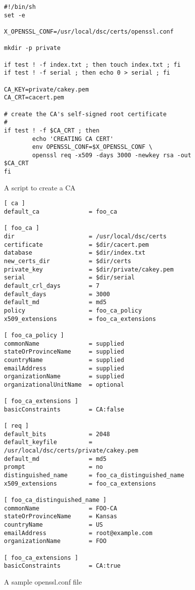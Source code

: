 \documentclass{report}
\begin{document}
\begin{figure}
\begin{verbatim}
#!/bin/sh
set -e

X_OPENSSL_CONF=/usr/local/dsc/certs/openssl.conf

mkdir -p private

if test ! -f index.txt ; then touch index.txt ; fi
if test ! -f serial ; then echo 0 > serial ; fi

CA_KEY=private/cakey.pem
CA_CRT=cacert.pem

# create the CA's self-signed root certificate
#
if test ! -f $CA_CRT ; then
        echo 'CREATING CA CERT'
        env OPENSSL_CONF=$X_OPENSSL_CONF \
        openssl req -x509 -days 3000 -newkey rsa -out $CA_CRT
fi
\end{verbatim}
\caption{\label{fig-create-ca-cert-sh}A script to create a CA}
\end{figure}


\begin{figure}
\begin{verbatim}
[ ca ]
default_ca              = foo_ca

[ foo_ca ]
dir                     = /usr/local/dsc/certs
certificate             = $dir/cacert.pem
database                = $dir/index.txt
new_certs_dir           = $dir/certs
private_key             = $dir/private/cakey.pem
serial                  = $dir/serial
default_crl_days        = 7
default_days            = 3000
default_md              = md5
policy                  = foo_ca_policy
x509_extensions         = foo_ca_extensions

[ foo_ca_policy ]
commonName              = supplied
stateOrProvinceName     = supplied
countryName             = supplied
emailAddress            = supplied
organizationName        = supplied
organizationalUnitName  = optional

[ foo_ca_extensions ]
basicConstraints        = CA:false

[ req ]
default_bits            = 2048
default_keyfile         = /usr/local/dsc/certs/private/cakey.pem
default_md              = md5
prompt                  = no
distinguished_name      = foo_ca_distinguished_name
x509_extensions         = foo_ca_extensions

[ foo_ca_distinguished_name ]
commonName              = FOO-CA
stateOrProvinceName     = Kansas
countryName             = US
emailAddress            = root@example.com
organizationName        = FOO

[ foo_ca_extensions ]
basicConstraints        = CA:true
\end{verbatim}
\caption{\label{fig-openssl-conf}A sample openssl.conf file}
\end{figure}
\end{document}
